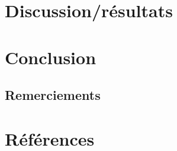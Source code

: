 \documentclass[a4paper, 12pt]{article}
\begin{document}
\section{Discussion/résultats} %



\section{Conclusion} %
\subsection{Remerciements}


\newpage
\section{Références} %


\end{document}

